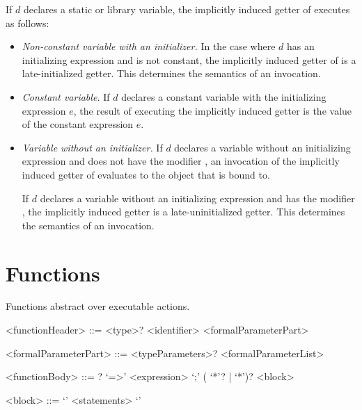 \documentclass[makeidx]{article}
\begin{document}
\LMHash{}%
If $d$ declares a static or library variable,
the implicitly induced getter of \id{} executes as follows:

\begin{itemize}
\item \emph{Non-constant variable with an initializer.}
  In the case where $d$ has an initializing expression and is not constant,
  the implicitly induced getter of \id{} is a late-initialized getter.
  This determines the semantics of an invocation.
\item \emph{Constant variable.}
  If $d$ declares a constant variable with the initializing expression $e$,
  the result of executing the implicitly induced getter is
  the value of the constant expression $e$.
\item \emph{Variable without an initializer.}
  If $d$ declares a variable \id{} without an initializing expression
  and does not have the modifier \LATE,
  an invocation of the implicitly induced getter of \id{} evaluates to
  the object that \id{} is bound to.


  If $d$ declares a variable \id{} without an initializing expression
  and has the modifier \LATE,
  the implicitly induced getter is a late-uninitialized getter.
  This determines the semantics of an invocation.
\end{itemize}

\vspace{-\baselineskip}\EndCase


\section{Functions}

\LMHash{}%
Functions abstract over executable actions.

\begin{grammar}
<functionHeader> ::= \gnewline{}
  <type>? <identifier> <formalParameterPart>

<formalParameterPart> ::= <typeParameters>? <formalParameterList>

<functionBody> ::= \ASYNC? `=>' <expression> `;'
  \alt (\ASYNC{} `*'? | \SYNC{} `*')? <block>

<block> ::= `{' <statements> `}'
\end{grammar}
\end{document}
